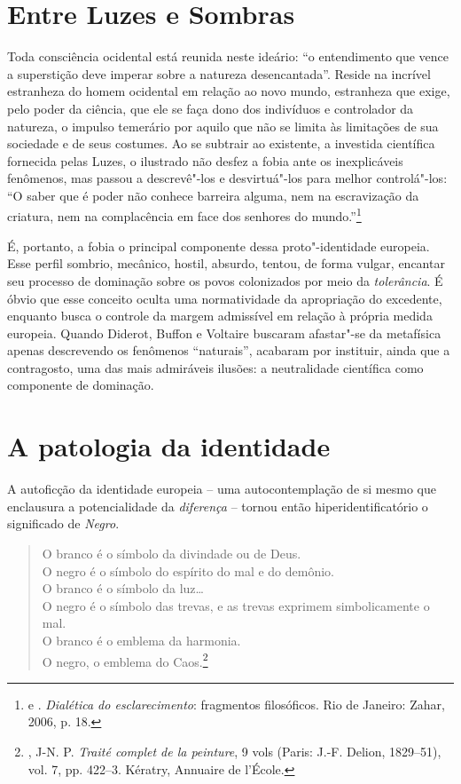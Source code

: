 \chapter{Entre Luzes e Sombras}

Toda consciência ocidental está reunida neste ideário: ``o entendimento
que vence a superstição deve imperar sobre a natureza desencantada''.
Reside na incrível estranheza do homem ocidental em relação ao novo
mundo, estranheza que exige, pelo poder da ciência, que ele se faça dono
dos indivíduos e controlador da natureza, o impulso temerário por aquilo
que não se limita às limitações de sua sociedade e de seus costumes. Ao
se subtrair ao existente, a investida científica fornecida pelas Luzes,
o ilustrado não desfez a fobia ante os inexplicáveis fenômenos, mas
passou a descrevê"-los e desvirtuá"-los para melhor controlá"-los:
``O saber que é poder não conhece
barreira alguma, nem na escravização da criatura, nem na complacência em
face dos senhores do mundo.''\footnote{ e .
  \emph{Dialética do esclarecimento}: fragmentos filosóficos. Rio de
  Janeiro: Zahar, 2006, p. 18.}

É, portanto, a fobia o principal componente dessa proto"-identidade
europeia. Esse perfil sombrio, mecânico, hostil, absurdo, tentou, de
forma vulgar, encantar seu processo de dominação sobre os povos
colonizados por meio da \emph{tolerância}.
É óbvio que esse conceito oculta
uma normatividade da apropriação do excedente, enquanto busca o controle
da margem admissível em relação à própria medida europeia. Quando
Diderot, Buffon e Voltaire buscaram afastar"-se da metafísica apenas
descrevendo os fenômenos ``naturais'', acabaram por instituir, ainda que
a contragosto, uma das mais admiráveis ilusões: a neutralidade
científica como componente de dominação.

\chapter{A patologia da identidade}

A autoficção da identidade europeia -- uma autocontemplação de si mesmo
que enclausura a potencialidade da \emph{diferença} -- tornou então
hiperidentificatório o significado de \emph{Negro}.

\begin{verse}
O branco é o símbolo da divindade ou de Deus.\\
O negro é o símbolo do espírito do mal e do demônio.\\
O branco é o símbolo da luz\ldots{}\\
O negro é o símbolo das trevas, e as trevas exprimem \qb{}simbolicamente o mal.\\
O branco é o emblema da harmonia.\\
O negro, o emblema do Caos.\footnote{, J-N. P. \emph{Traité complet de la peinture}, 9 vols (Paris: J.-F. Delion, 1829–51), vol. 7, pp. 422--3. Kératry, Annuaire de l'École.}
\end{verse}

